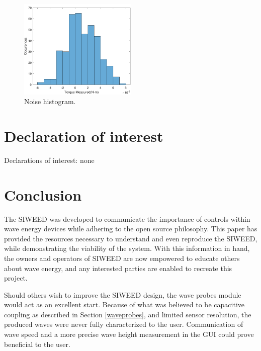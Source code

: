 \documentclass[11pt, letterpaper]{article}
\begin{document}
\begin{figure}[tb]
  \centering
  \includegraphics[width=0.5\textwidth]{diagrams/NoiseHistogram.pdf}
  \caption{Noise histogram.}
  \label{fig:NoiseHistogram}
\end{figure}


\section{Declaration of interest}
Declarations of interest: none
\section{Conclusion}
The SIWEED was developed to communicate the importance of controls within wave energy devices while adhering to the open source philosophy. 
This paper has provided the resources necessary to understand and even reproduce the SIWEED, while demonstrating the viability of the system. 
With this information in hand, the owners and operators of SIWEED are now empowered to educate others about wave energy, and any interested parties are enabled to recreate this project.


Should others wish to improve the SIWEED design, the wave probes module would act as an excellent start.
Because of what was believed to be capacitive coupling as described in Section \ref{waveprobes}, and limited sensor resolution, the produced waves were never fully characterized to the user.
Communication of wave speed and a more precise wave height measurement in the GUI could prove beneficial to the user. 
\end{document}
